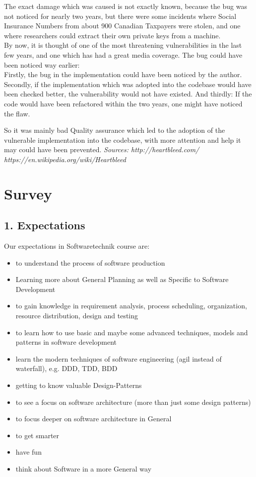 \documentclass{scrartcl}
\begin{document}
The exact damage which was caused is not exactly known, because the bug was not noticed for nearly two years, but there were some incidents where
Social Insurance Numbers from about 900 Canadian Taxpayers were stolen, and one where researchers could extract their own private keys from a machine.\\
By now, it is thought of one of the most threatening vulnerabilities in the last few years, and one which has had a great media coverage.
The bug could have been noticed way earlier:\\
Firstly, the bug in the implementation could have been noticed by the author.
Secondly, if the implementation which was adopted into the codebase would have been checked better, the vulnerability would not have existed.
And thirdly: If the code would have been refactored within the two years, one might have noticed the flaw.

So it was mainly bad Quality assurance which led to the adoption of the vulnerable implementation into the codebase, with more attention and help it may could have been prevented.
\em Sources: http://heartbleed.com/ \hspace{1cm} https://en.wikipedia.org/wiki/Heartbleed
\em 
\section*{Survey}

\subsection*{1. Expectations}
Our expectations in Softwaretechnik course are:
\begin{itemize}
\item to understand the process of software production
\item Learning more about General Planning as well as
Specific to Software Development
\item to gain knowledge in requirement analysis, process scheduling,
organization, resource distribution, design and testing
\item to learn how to use basic and maybe some advanced techniques,
models and patterns in software development
\item learn the modern techniques of software engineering (agil instead of waterfall), e.g. DDD, TDD, BDD
\item getting to know valuable Design-Patterns
\item to see a focus on software architecture (more than just some design patterns)
\item to focus deeper on software architecture in General
\item to get smarter
\item have fun
\item think about Software in a more General way
\end{itemize}
\end{document}
